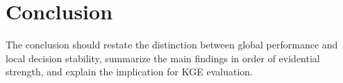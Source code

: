 \section{Conclusion}
\label{chap:conclusion}


The conclusion should restate the distinction between global performance and local decision stability, summarize the main findings in order of evidential strength, and explain the implication for KGE evaluation.
